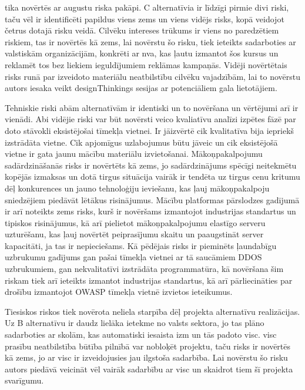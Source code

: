 tika novērtēs ar augustu riska pakāpi. C alternatīvia ir līdzīgi pirmie divi riski, taču vēl ir
identificēti papildus viens zems un viens vidējs risks, kopā veidojot četrus dotajā risku veidā.
Cilvēku intereses trūkums ir viens no paredzētiem riskiem, tas ir novērtēs kā zems, lai novērstu
šo risku, tiek ieteikts sadarboties ar valstiskām organizācijām, konkrēti ar \acrshort{nva}, kas
ļautu izmantot šos kursus un reklamēt tos bez liekiem ieguldījumiem reklāmas kampaņās. Vidēji
novērtētais risks runā par izveidoto materiālu neatbilstību cilvēku vajadzībām, lai to novērstu
autors iesaka veikt \glspl{designThinking} sesijas ar potenciāliem gala lietotājiem.
\par
Tehniskie riski abām alternatīvām ir identiski un to novēršana un vērtējumi arī ir vienādi.
Abi vidējie riski var būt novērsti veico kvaliatīvu analīzi izpētes fāzē par doto stāvokli
eksistējošai tīmekļa vietnei. Ir jāizvērtē cik kvalitatīva bija iepriekš izstrādāta vietne.
Cik apjomīgus uzlabojumus būtu jāveic un cik eksistējošā vietne ir gata jaunu mācību materiālu
izvietošanai. Mākoņpakalpojumu sadārdzināšanās risks ir novērtēts kā zems, jo sadārdzinājums
spēcīgi neitekmētu kopējās izmaksas un dotā tirgus situācija vairāk ir tendēta uz tirgus cenu
kritumu dēļ konkurences un jauno tehnoloģiju ieviešanu, kas ļauj mākoņpakalpoju sniedzējiem piedāvāt
lētākus risinājumus. Mācību platformas pārslodzes gadījumā ir arī noteikts zems risks, kurš ir
novēršams izmantojot industrijas standartus un tipiskos risinājumus, kā arī pielietot mākoņpakalpojumu
elastīgo serveru uzturēšanu, kas ļauj novērtēt peiprasījumu skaitu un paaugstināt server kapacitāti, ja
tas ir nepieciešams. Kā pēdējais risks ir pieminēts ļaundabīgu uzbrukumu gadījums gan pašai tīmekļa
vietnei ar tā saucāmiem DDOS uzbrukumiem, gan nekvalitatīvi izstrādāta programmatūra, kā novēršana
šim riskam tiek arī ieteikts izmantot industrijas standartus, kā arī pārliecināties par drošību
izmantojot OWASP tīmekļa vietnē izvietos ieteikumus.
\par
Tiesiskos riskos tiek novērota neliela starpība dēļ projekta alternatīvu realizācijas. Uz B
alternatīvu ir daudz lielāka ietekme no valsts sektora, jo tas plāno sadarboties ar skolām, kas
automatiski iesaista \acrshort{izm} un tās padoto \acrshort{visc}. \acrshort{visc} prasību
neatbilstība būtība pilnībā var nobloķēt projektu, taču risks ir novērtēs kā zems, jo ar
\acrshort{visc} ir izveidojusies jau ilgstoša sadarbība. Lai novērstu šo risku autors piedāvā
veicināt vēl vairāk sadarbību ar \acrshort{visc} un skaidrot tiem šī projekta svarīgumu.
